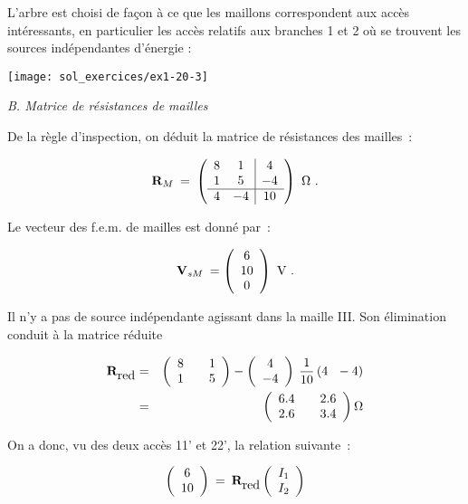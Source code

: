 L'arbre est choisi de façon à ce que les maillons correspondent aux
accès intéressants, en particulier les accès relatifs aux branches 1
et 2 où se trouvent les sources indépendantes d'énergie :
\begin{center}
\texttt{[image: sol\_exercices/ex1-20-3]}
\end{center}



{\em B. Matrice de résistances de mailles}

De la règle d'inspection, on déduit la matrice de résistances des mailles~:

\[ {\bf R}_M \: = \: \left( \begin{array}{cc|c}
8 & 1 & 4\\
1 & 5 & -4\\ \hline
4 & -4 & 10
\end{array} \right) \,\, \Omega~.\]

Le vecteur des f.e.m. de mailles est donné par~:

\[ {\bf V}_{sM} \: = \left( \begin{array}{c}
6 \\ 10 \\ 0
\end{array} \right) \,\, \text{V~.}\]


Il n'y a pas de source indépendante agissant dans la maille III. Son
élimination conduit à la matrice réduite

\begin{eqnarray*}
{\bf R}_{\mbox{red}} &=& 
\left( \begin{array}{ccc} 8 && 1\\ 1 && 5 \end{array} \right) 
- \left( \begin{array}{c} 4 \\ -4 \end{array} \right) \: \frac{1}{10} \left( 4~~ -4\right)\\
&=& \left( \begin{array}{ccc} 6.4 && 2.6\\ 2.6 && 3.4 \end{array} \right) \Omega
\end{eqnarray*}

On a donc, vu des deux accès 11' et 22', la relation suivante~:

\[ \left( \begin{array}{c} 6\\ 10  \end{array} \right) 
\: = \: {\bf R}_{\mbox{red}} \left( \begin{array}{c} I_1\\ I_2 \end{array} \right)  \]


